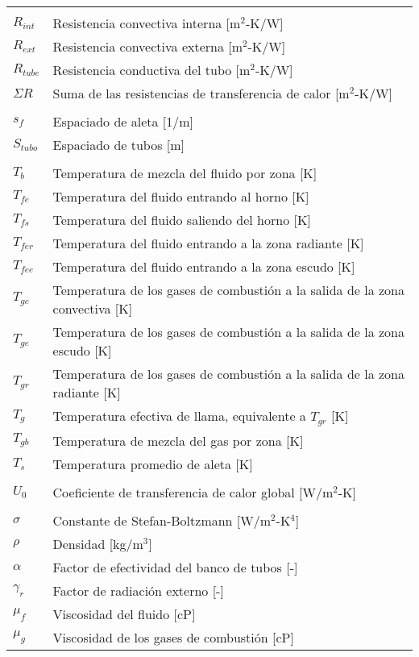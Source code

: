 \begin{tabular}{ll}
\\
\\
$R_{int}$  & Resistencia convectiva interna [m$^2$-K/W]\\
$R_{ext}$  & Resistencia convectiva externa [m$^2$-K/W] \\
$R_{tube}$ & Resistencia conductiva del tubo [m$^2$-K/W]\\
$\Sigma R$ & Suma de las resistencias de transferencia de calor [m$^2$-K/W]\\
\\
$s_f$      & Espaciado de aleta [1/m]\\
$S_{tubo}$ & Espaciado de tubos [m] \\
\\
$T_b$ & Temperatura de mezcla del fluido por zona [K] \\
$T_{fe}$& Temperatura del fluido entrando al horno [K] \\
$T_{fs}$& Temperatura del fluido saliendo del horno [K] \\
$T_{fer}$& Temperatura del fluido entrando a la zona radiante [K] \\
$T_{fee}$& Temperatura del fluido entrando a la zona escudo [K] \\
$T_{gc}$& Temperatura de los gases de combustión a la salida de la zona convectiva [K] \\
$T_{ge}$& Temperatura de los gases de combustión a la salida de la zona escudo [K] \\
$T_{gr}$& Temperatura de los gases de combustión a la salida de la zona radiante [K] \\
$T_g$   & Temperatura efectiva de llama, equivalente a $T_{gr}$ [K] \\
$T_{gb}$& Temperatura de mezcla del gas por zona [K] \\
$T_s$ & Temperatura promedio de aleta [K]\\
\\
$U_0$ & Coeficiente de transferencia de calor global [W/m$^2$-K] \\
\\
$\sigma$    & Constante de Stefan-Boltzmann [W/m$^2$-K$^4$] \\
$\rho$      & Densidad [kg/m$^3$] \\
$\alpha$    & Factor de efectividad del banco de tubos [-]\\
$\gamma_r$  & Factor de radiación externo [-] \\
$\mu_f$     & Viscosidad del fluido [cP] \\
$\mu_g$     & Viscosidad de los gases de combustión [cP] \\
\end{tabular}